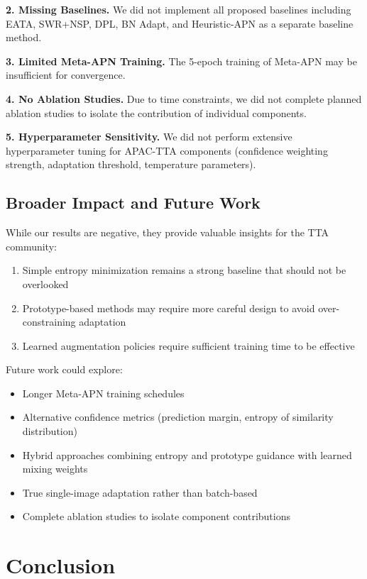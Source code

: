 \documentclass{article}
\begin{document}
\textbf{2. Missing Baselines.} We did not implement all proposed baselines including EATA, SWR+NSP, DPL, BN Adapt, and Heuristic-APN as a separate baseline method.

\textbf{3. Limited Meta-APN Training.} The 5-epoch training of Meta-APN may be insufficient for convergence.

\textbf{4. No Ablation Studies.} Due to time constraints, we did not complete planned ablation studies to isolate the contribution of individual components.

\textbf{5. Hyperparameter Sensitivity.} We did not perform extensive hyperparameter tuning for APAC-TTA components (confidence weighting strength, adaptation threshold, temperature parameters).

\subsection{Broader Impact and Future Work}

While our results are negative, they provide valuable insights for the TTA community:
\begin{enumerate}
    \item Simple entropy minimization remains a strong baseline that should not be overlooked
    \item Prototype-based methods may require more careful design to avoid over-constraining adaptation
    \item Learned augmentation policies require sufficient training time to be effective
\end{enumerate}

Future work could explore:
\begin{itemize}
    \item Longer Meta-APN training schedules
    \item Alternative confidence metrics (prediction margin, entropy of similarity distribution)
    \item Hybrid approaches combining entropy and prototype guidance with learned mixing weights
    \item True single-image adaptation rather than batch-based
    \item Complete ablation studies to isolate component contributions
\end{itemize}

\section{Conclusion}
\end{document}
